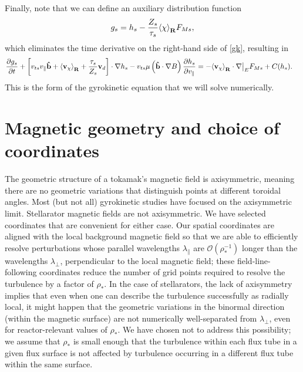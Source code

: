 \documentclass{jpp}
\renewcommand{\vec}[1]{\ensuremath{\mbox{$ {\bf #1} $}}} %
\begin{document}
Finally, note that we can define an auxiliary distribution function 
\begin{equation}
    g_s = h_s - \frac{Z_s}{\tau_s}\langle{ \chi \rangle}_{\bf R}F_{Ms},
\end{equation}
which eliminates the time derivative on the right-hand side of \cref{gk}, resulting in
\begin{align}
\frac{\partial g_s}{\partial t} & + \left[v_{ts} v_\parallel {\bf \hat{b}} + \langle{  {\bf v}_{\chi} \rangle}_{\bf R} +
                  \frac{\tau_s}{Z_s}{\bf v}_d \right] \cdot \nabla h_s - v_{ts} \mu \left({\bf \hat{b}}\cdot\nabla B\right) \frac{\partial h_s}{\partial v_\parallel}
                  = - \langle{  {\bf v}_{\chi} \rangle}_{\bf R} \cdot \nabla\big|_E F_{Ms} + C(h_s).
\label{gkg}
\end{align}
This is the form of the gyrokinetic equation that we will solve numerically. 

{\color{black}\section{Magnetic geometry and choice of coordinates} \label{sec:geo}}
The geometric structure of a tokamak's magnetic field is axisymmetric, meaning there are no geometric variations that distinguish points at different toroidal angles. Most (but not all) gyrokinetic studies have focused on the axisymmetric limit. Stellarator magnetic fields are not axisymmetric. We have selected coordinates that are convenient for either case. Our spatial coordinates are aligned with the local background magnetic field so that we are able to efficiently resolve perturbations whose parallel wavelengths $\lambda_\parallel$ are $\mathcal{O}(\rho_*^{-1})$ longer than the wavelengths $\lambda_\perp$, perpendicular to the local magnetic field; these field-line-following coordinates reduce the number of grid points required to resolve the turbulence by a factor of $\rho_*$. In the case of stellarators, the lack of axisymmetry implies that even when one can describe the turbulence successfully as radially local, it might happen that the geometric variations in the binormal direction (within the magnetic surface) are not numerically well-separated from $\lambda_\perp$, even for reactor-relevant values of $\rho_*$. We have chosen not to address this possibility; we assume that $\rho_*$ is small enough that the turbulence within each flux tube in a given flux surface is not affected by turbulence occurring in a different flux tube within the same surface. 
\end{document}
